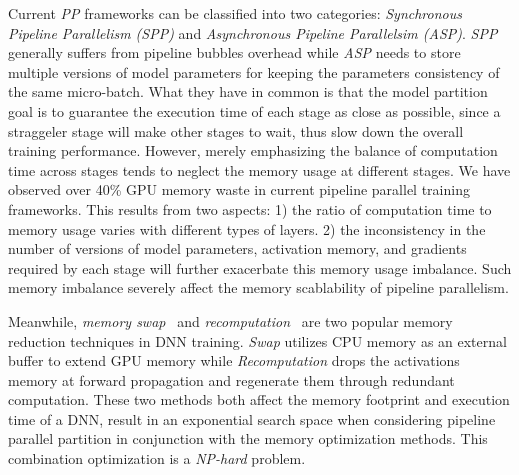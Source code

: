 Current \emph{PP} frameworks can be classified into two categories:
\emph{Synchronous Pipeline Parallelism (SPP)} and \emph{Asynchronous Pipeline Parallelsim (ASP)}.
\emph{SPP} generally suffers from pipeline bubbles overhead
while \emph{ASP} needs to store multiple versions of model parameters
for keeping the parameters consistency of the same micro-batch.
What they have in common is that the model partition goal is
to guarantee the execution time of each stage as close as possible,
since a straggeler stage will make other stages to wait,
thus slow down the overall training performance.
However, merely emphasizing the balance of computation time
across stages tends to neglect the memory usage at different stages.
We have observed over 40\% GPU memory waste in current pipeline parallel training frameworks.
This results from two aspects: 1) the ratio of computation time to memory usage
varies with different types of layers.
2) the inconsistency in the number of versions of model parameters,
activation memory, and gradients required by each stage will
further exacerbate this memory usage imbalance.
Such memory imbalance severely affect the memory scablability of pipeline parallelism.

Meanwhile, \emph{memory swap}~\cite{rhuVDNNVirtualizedDeep2016,jinLayerCentricMemoryReuse2018,wangSuperneuronsDynamicGPU2018,huangSwapAdvisorPushingDeep2020,renSentinelEfficientTensor2021}
and \emph{recomputation}~\cite{chenTrainingDeepNets2016,kirisameDynamicTensorRematerialization,heHOMEHolisticGPU2022,korthikantiReducingActivationRecomputation2023} are two popular
memory reduction techniques in DNN training.
\emph{Swap} utilizes CPU memory as an external buffer to extend GPU memory
while \emph{Recomputation} drops the activations memory at forward propagation
and regenerate them through redundant computation.
These two methods both affect the memory footprint and execution time of a DNN,
result in an exponential search space
when considering pipeline parallel partition in conjunction with
the memory optimization methods.
This combination optimization is a \emph{NP-hard} problem.


